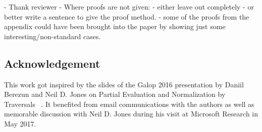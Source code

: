 \documentclass{elsarticle}
\theoremstyle{plain}
\theoremstyle{definition}
\theoremstyle{remark}
\begin{document}
\begin{todobox}
- Thank reviewer
- Where proofs are not given:
    - either leave out completely
    - or better  write a sentence to give the proof method.
    - some of the proofs from the appendix could have been brought into
    the paper by showing just some interesting/non-standard cases.
\end{todobox}






\subsection*{Acknowledgement}
This work got inspired by the slides of the Galop 2016 presentation by Daniil Berezun and Neil D. Jones on Partial Evaluation and Normalization by Traversals
~\cite{berezunjones_partialevalbytraversals}. It benefited from email communications with the authors as well as memorable discussion with Neil D. Jones during his visit at Microsoft Research in May 2017.
\end{document}
